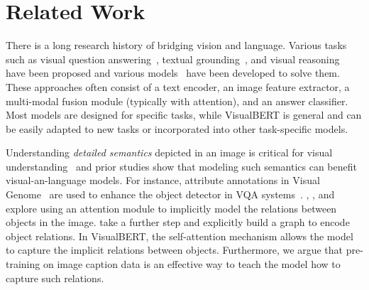 \documentclass{article} \usepackage{iclr2019_conference,times}
\newcommand{\model}{VisualBERT\xspace}
\begin{document}
\section{Related Work}
\label{sec:related}
There is a long research history of bridging vision and language. Various tasks such as visual question answering~\citep{antol2015vqa,balanced_vqa_v2}, textual grounding~\citep{kazemzadeh2014referitgame,plummer2015flickr30k}, and visual reasoning~\citep{suhr2018corpus,zellers2019recognition} have been proposed and various models~\citep{yang2016stacked,anderson2018bottom,jiang2018pythia} have been developed to solve them. These approaches often consist of a text encoder, an image feature extractor, a multi-modal fusion module (typically with attention), and an answer classifier. Most models are designed for specific tasks, while \model is general and can be easily adapted to new tasks or incorporated into other task-specific models.

Understanding \textit{detailed semantics} depicted in an image is critical for visual understanding~\citep{johnson2015image} and prior studies show that modeling such semantics can benefit visual-an-language models. 
For instance, attribute annotations in Visual Genome~\citep{krishna2017visual} are used to enhance the object detector in VQA systems~\citep{anderson2018bottom}. \citet{santoro2017simple}, \citet{norcliffe2018learning}, and \citet{cadene2019murel} explore using an attention module to implicitly model the relations between objects in the image. \citet{Li2019RelationawareGA} take a further step and explicitly build a graph to encode object relations. In \model, the self-attention mechanism allows the model to capture the implicit relations between objects. Furthermore, we argue that pre-training on image caption data is an effective way to teach the model how to capture such relations.
\end{document}
